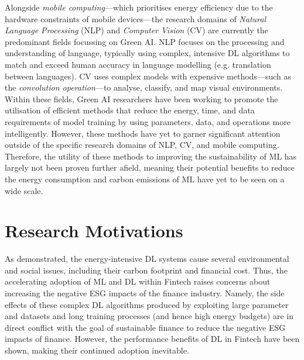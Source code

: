 \documentclass[a4paper, 11pt]{report}
\begin{document}
    Alongside \emph{mobile computing}---which prioritises energy efficiency due to the hardware constraints of mobile devices---the research domains of \emph{Natural Language Processing} (NLP) and \emph{Computer Vision} (CV) are currently the predominant fields focussing on Green AI. NLP focuses on the processing and understanding of language, typically using complex, intensive DL algorithms to match and exceed human accuracy in language modelling (e.g. translation between languages). CV uses complex models with expensive methods---such as the \emph{convolution operation}---to analyse, classify, and map visual environments. Within these fields, Green AI researchers have been working to promote the utilisation of efficient methods that reduce the energy, time, and data requirements of model training by using parameters, data, and operations more intelligently. However, these methods have yet to garner significant attention outside of the specific research domains of NLP, CV, and mobile computing. Therefore, the utility of these methods to improving the sustainability of ML has largely not been proven further afield, meaning their potential benefits to reduce the energy consumption and carbon emissions of ML have yet to be seen on a wide scale.


    \section{Research Motivations}
    \label{section: motivations}

    As demonstrated, the energy-intensive DL systems cause several environmental and social issues, including their carbon footprint and financial cost. Thus, the accelerating adoption of ML and DL within Fintech raises concerns about increasing the negative ESG impacts of the finance industry. Namely, the side effects of these complex DL algorithms produced by exploiting large parameter and datasets and long training processes (and hence high energy budgets) are in direct conflict with the goal of sustainable finance to reduce the negative ESG impacts of finance. However, the performance benefits of DL in Fintech have been shown, making their continued adoption inevitable. 
\end{document}
